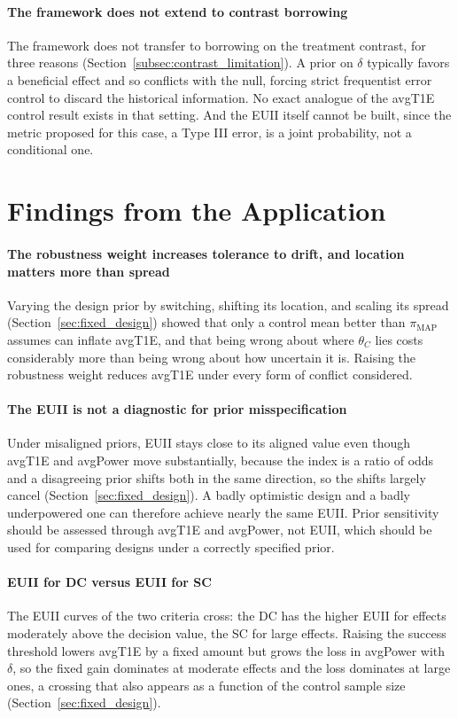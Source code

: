 \paragraph{The framework does not extend to contrast borrowing}
The framework does not transfer to borrowing on the treatment contrast, for three reasons
(Section~\ref{subsec:contrast_limitation}). A prior on
$\delta$ typically favors a beneficial effect and so conflicts with the null, forcing strict
frequentist error control to discard the historical information. No exact analogue of the avgT1E
control result exists in that setting. And the EUII itself cannot be built, since the
metric proposed for this case, a Type III error, is a joint probability, not a conditional
one.

\section{Findings from the Application}

\paragraph{The robustness weight increases tolerance to drift, and location matters more than spread}
Varying the design prior by switching, shifting its location, and scaling its spread
(Section~\ref{sec:fixed_design}) showed that only
a control mean better than $\pi_{\text{MAP}}$ assumes can inflate avgT1E, and that being wrong about
where $\theta_C$ lies costs considerably more than being wrong about how uncertain it is. Raising
the robustness weight reduces avgT1E under every form of conflict considered.

\paragraph{The EUII is not a diagnostic for prior misspecification}
Under misaligned priors, EUII stays close to its aligned value
even though avgT1E and avgPower move substantially, because the index is a ratio of odds and a
disagreeing prior shifts both in the same direction, so the shifts largely cancel
(Section~\ref{sec:fixed_design}). A badly optimistic
design and a badly underpowered one can therefore achieve nearly the same EUII. Prior sensitivity
should be assessed through avgT1E and avgPower, not EUII, which should be used for comparing
designs under a correctly specified prior.

\paragraph{EUII for DC versus EUII for SC}
The EUII curves of the two criteria cross: the DC has the higher EUII for effects moderately above
the decision value, the SC for large effects. Raising the success threshold lowers avgT1E by a
fixed amount but grows the loss in avgPower with $\delta$, so the fixed gain dominates at moderate
effects and the loss dominates at large ones, a crossing that also appears as a function of the
control sample size (Section~\ref{sec:fixed_design}). 

